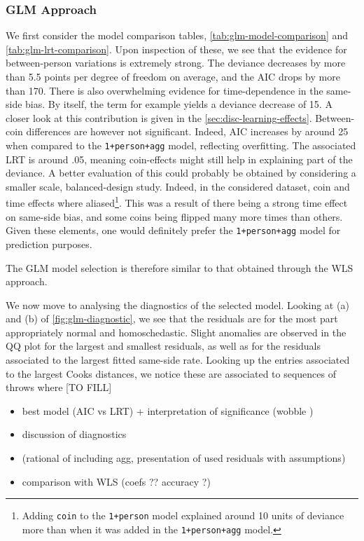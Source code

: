 \documentclass[a4paper, 12pt,oneside]{article}
\begin{document}
		\subsubsection{GLM Approach}
			We first consider the model comparison tables, \ref{tab:glm-model-comparison} and \ref{tab:glm-lrt-comparison}. 
			Upon inspection of these, we see that the evidence for between-person variations is extremely strong. The deviance decreases by more than 5.5 points per degree of freedom on average, and the AIC drops by more than 170. There is also overwhelming evidence for time-dependence in the same-side bias. By itself, the term for example yields a deviance decrease of 15. A closer look at this contribution is given in the \ref{sec:disc-learning-effects}. 
			Between-coin differences are however not significant. Indeed, AIC increases by around 25 when compared to the \texttt{1+person+agg} model, reflecting overfitting. The associated LRT is around .05, meaning coin-effects might still help in explaining part of the deviance. A better evaluation of this could probably be obtained by considering a smaller scale, balanced-design study. Indeed, in the considered dataset, coin and time effects where aliased\footnote{Adding \texttt{coin} to the \texttt{1+person} model explained around 10 units of deviance more than when it was added in the \texttt{1+person+agg} model.}. This was a result of there being a strong time effect on same-side bias, and some coins being flipped many more times than others. 
			Given these elements, one would definitely prefer the \texttt{1+person+agg} model for prediction purposes.  

			The GLM model selection is therefore similar to that obtained through the WLS approach. 

			We now move to analysing the diagnostics of the selected model. Looking at (a) and (b) of \ref{fig:glm-diagnostic}, we see that the residuals are for the most part appropriately normal and homoschedastic. Slight anomalies are observed in the QQ plot for the largest and smallest residuals, as well as for the residuals associated to the largest fitted same-side rate. Looking up the entries associated to the largest Cooks distances, we notice these are associated to sequences of throws where [TO FILL]
			\begin{itemize}
				\item best model (AIC vs LRT) + interpretation of significance (wobble )
				\item discussion of diagnostics 
				\item (rational of including agg, presentation of used residuals with assumptions)
				\item comparison with WLS (coefs ?? accuracy ?)
			\end{itemize}
\end{document}
